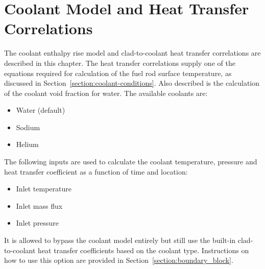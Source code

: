 \chapter{Coolant Model and Heat Transfer Correlations} \label{chapter:HTC_and_models}
The coolant enthalpy rise model and clad-to-coolant heat transfer correlations are described in this
chapter. The heat transfer correlations supply one of the equations required for calculation of the
fuel rod surface temperature, as discussed in Section~\ref{section:coolant-conditions}. Also
described is the calculation of the coolant void fraction for water. The available coolants are:

\begin{itemize}
  \item Water (default)
  \item Sodium
  \item Helium
\end{itemize}

The following inputs are used to calculate the coolant temperature, pressure and heat transfer
coefficient as a function of time and location:

\begin{itemize}
  \item Inlet temperature
  \item Inlet mass flux
  \item Inlet pressure
\end{itemize}

It is allowed to bypass the coolant model entirely but still use the built-in clad-to-coolant heat
transfer coefficients based on the coolant type. Instructions on how to use this option are provided
in Section~\ref{section:boundary_block}.





